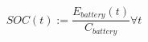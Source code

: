 \begin{equation}
	SOC(t) := \frac{E_{battery}(t)}{C_{battery}} \forall t
	\label{ch1:equ:state-of-charge-definition}
\end{equation}